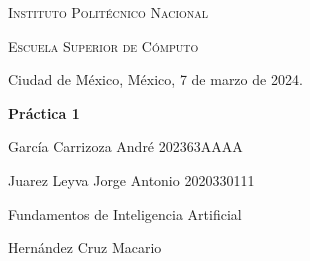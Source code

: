 \documentclass[letterpaper,11pt]{article}
\begin{document}
	\begin{titlepage}
		\centering
	
		{\scshape\huge Instituto Politécnico Nacional \par}
		\vspace{1cm}
		{\scshape\Large Escuela Superior de Cómputo \par}
		\vspace{0.3cm}
		Ciudad de México, México,  7 de marzo de 2024.
	
		\vfill
	
		{\huge\bfseries Práctica 1 \par}
	
		\vfill
	
		{\large García Carrizoza André  202363AAAA \par}
		
		{\large Juarez Leyva Jorge Antonio  2020330111\par}
		\vspace*{0.5cm}
		{\large Fundamentos de Inteligencia Artificial}\par
		{\large Hernández Cruz Macario}\par
		\vfill
	
	\end{titlepage}
	
	
	
	
	
	
\end{document}
